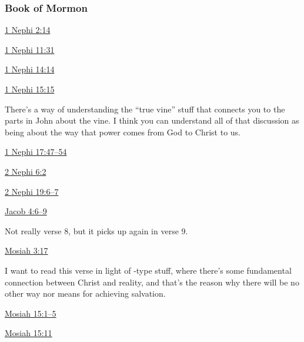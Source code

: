 	\subsubsection{Book of Mormon} %
		\label{PRIESTHOOD-BOM}
	
		
		\begin{compactdesc}
			\item[{\hyperref[1NEPHI-2-14]{1 Nephi 2:14}}]
			\item[{\hyperref[1NEPHI-11-31]{1 Nephi 11:31}}]	
			\item[{\hyperref[1NEPHI-14-14]{1 Nephi 14:14}}]	
			\item[{\hyperref[1NEPHI-15-15]{1 Nephi 15:15}}] \phantom{.}
				\begin{compactitem}
					\item There's a way of understanding the ``true vine'' stuff that connects you to the parts in John about the vine. I think you can understand all of that discussion as being about the way that power comes from God to Christ to us.
				\end{compactitem}
			\item[{\hyperref[1NEPHI-17-47]{1 Nephi 17:47--54}}]
			\item[{\hyperref[2NEPHI-6-2]{2 Nephi 6:2}}]
			\item[{\hyperref[2NEPHI-19-6]{2 Nephi 19:6--7}}]
			\item[{\hyperref[JACOB-4-6]{Jacob 4:6--9}}] \phantom{.}
				\begin{compactitem}
					\item Not really verse 8, but it picks up again in verse 9.
				\end{compactitem}
			\item[{\hyperref[MOSIAH-3-17]{Mosiah 3:17}}] \phantom{.}
				\begin{compactitem}
					\item I want to read this verse in light of -type stuff, where there's some fundamental connection between Christ and reality, and that's the reason why there will be no other way nor means for achieving salvation.
				\end{compactitem}
			\item[{\hyperref[MOSIAH-15-1]{Mosiah 15:1--5}}]
			\item[{\hyperref[MOSIAH-15-1]{Mosiah 15:11}}] \phantom{.}

\end{compactdesc}
